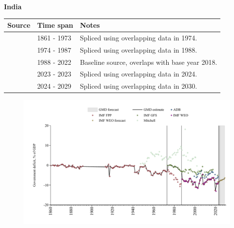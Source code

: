\documentclass[12pt,a4paper,landscape]{article}
\begin{document}
\begin{adjustbox}{max totalsize={\paperwidth}{\paperheight},center}
\begin{minipage}[t][\textheight][t]{\textwidth}
\vspace*{0.5cm}
{}
\begin{center}
{\Large\bfseries India}
\end{center}
\vspace{0.5cm}
\begin{table}[H]
\centering
\small
\begin{tabular}{|l|l|l|}
\hline
\textbf{Source} & \textbf{Time span} & \textbf{Notes} \\
\hline
\rowcolor{white}\cite{IMF_FPP}& 1861 - 1973 &Spliced using overlapping data in 1974.\\
\rowcolor{lightgray}\cite{IMF_GFS}& 1974 - 1987 &Spliced using overlapping data in 1988.\\
\rowcolor{white}\cite{IMF_WEO}& 1988 - 2022 &Baseline source, overlaps with base year 2018.\\
\rowcolor{lightgray}\cite{IMF_FPP}& 2023 - 2023 &Spliced using overlapping data in 2024.\\
\rowcolor{white}\cite{IMF_WEO_forecast}& 2024 - 2029 &Spliced using overlapping data in 2030.\\
\hline
\end{tabular}
\end{table}
\begin{figure}[H]
\centering
\includegraphics[width=\textwidth,height=0.6\textheight,keepaspectratio]{graphs/IND_govdef_GDP.pdf}
\end{figure}
\end{minipage}
\end{adjustbox}
\end{document}
